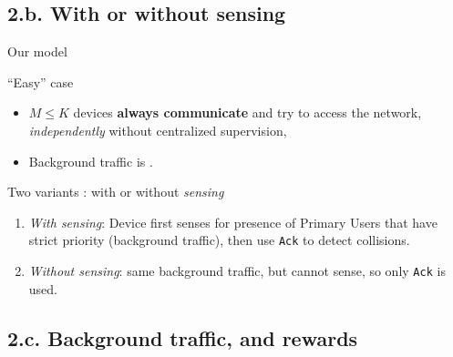 \subsection{\hfill{}2.b. With or without sensing\hfill{}}

\begin{frame}[fragile]{Our model}

\begin{block}{``Easy'' case}

\begin{itemize}\tightlist
\item
  \(M \leq K\) devices \textbf{always communicate} and try to access the
  network, \emph{independently} without centralized supervision,
\item
  Background traffic is \iid.
\end{itemize}

\end{block}

\pause

\begin{block}{Two variants : with or without \emph{sensing}}

\begin{enumerate}
\def\labelenumi{\arabic{enumi}.}
\tightlist
\item
  \emph{With sensing}: Device first senses for presence of Primary Users that have strict priority
  (background traffic), then use \texttt{Ack} to detect collisions.
\item
  \emph{Without sensing}: same background traffic, but cannot sense, so
  only \texttt{Ack} is used.
\end{enumerate}

\end{block}

\end{frame}



\subsection{\hfill{}2.c. Background traffic, and rewards\hfill{}}

